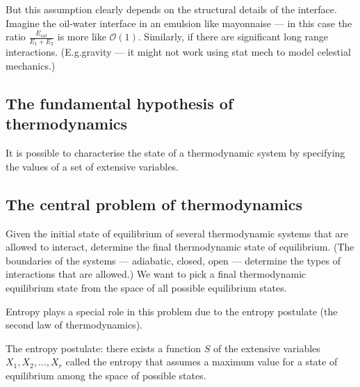 \documentclass{article}
\begin{document}
But this assumption clearly depends on the structural details of the interface. Imagine the oil-water interface in an emulsion like mayonnaise --- in this case the ratio  $\frac{E_{int}}{E_1+E_2}$ is more like $\mathcal{O}(1)$.
Similarly, if there are significant long range interactions. (E.g.gravity --- it might not work using stat mech to model celestial mechanics.)

\subsection*{The fundamental hypothesis of thermodynamics}
It is possible to characterise the state of a thermodynamic system by specifying the values of a set of extensive variables.

\subsection*{The central problem of thermodynamics}
Given the initial state of equilibrium of several thermodynamic systems that are allowed to interact, determine the final thermodynamic state of equilibrium. (The boundaries of the systems --- adiabatic, closed, open --- determine the types of interactions that are allowed.) We want to pick a final thermodynamic equilibrium state from the space of all possible equilibrium states.

Entropy plays a special role in this problem due to the entropy postulate (the second law of thermodynamics).

The entropy postulate: there exists a function $S$ of the extensive variables $X_1,X_2,\ldots,X_r$ called the entropy that assumes a maximum value for a state of equilibrium among the space of possible states.
\end{document}
